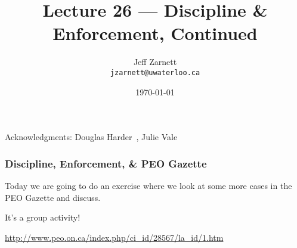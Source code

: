 

\title{Lecture 26 --- Discipline \& Enforcement, Continued }

\author{Jeff Zarnett \\ \small \texttt{jzarnett@uwaterloo.ca}}
\date{\today}




\begin{frame}
  \titlepage

\begin{center}
  \small{Acknowledgments: Douglas Harder~\cite{dwh}, Julie Vale~\cite{jv}}
  \end{center}
\end{frame}




\begin{frame}
\frametitle{Discipline, Enforcement, \& PEO Gazette}

Today we are going to do an exercise where we look at some more cases in the PEO Gazette and discuss.

It's a group activity!

\url{http://www.peo.on.ca/index.php/ci_id/28567/la_id/1.htm}


\end{frame}





